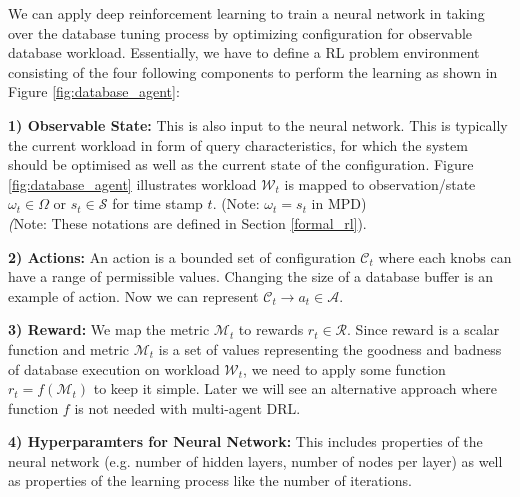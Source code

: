 We can apply deep reinforcement learning to train a neural network in taking
over the database tuning process by optimizing configuration for observable database workload.
Essentially, we have to define a RL problem environment
consisting of the four following components to perform the learning as shown in Figure \ref{fig:database_agent}:


\textbf{1) Observable State:} This is also input to the neural network. This is typically the current workload in form of
query characteristics, for which the system should be optimised as well as the current state
of the configuration. Figure \ref{fig:database_agent} illustrates workload $\mathcal{W}_t$ is mapped to observation/state $\omega_t \in \Omega$ or $s_t \in  \mathcal{S}$ for time stamp $t$. (Note: $\omega_t = s_t$ in MPD)\\
\textit(Note: These notations are defined in Section \ref{formal_rl}).

\textbf{2) Actions:} An action is a bounded set of configuration $\mathcal{C}_t$ where each knobs can have a range of permissible values.
Changing the size of a database buffer is an example of action. Now we can represent $\mathcal{C}_t  \rightarrow a_t \in \mathcal{A}$.

\textbf{3) Reward:}
We map the metric $\mathcal{M}_t$ to rewards $r_t \in \mathcal{R}$. Since reward is a scalar function and metric $\mathcal{M}_t$ is a set of values representing the goodness and badness of database execution on workload $\mathcal{W}_t$, we need to apply some function $r_t = f(\mathcal{M}_t)$ to keep it simple. Later we will see an alternative approach where function $f$ is not needed with multi-agent DRL.

\textbf{4) Hyperparamters for Neural Network:}
This includes properties of
the neural network (e.g. number of hidden layers, number of nodes per layer) as well as
properties of the learning process like the number of iterations.







